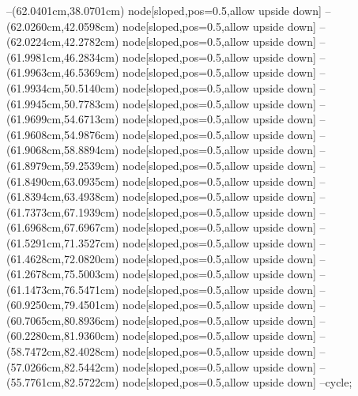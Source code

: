 --(62.0401cm,38.0701cm) node[sloped,pos=0.5,allow upside down]{\arrowIn}
--(62.0260cm,42.0598cm) node[sloped,pos=0.5,allow upside down]{\ArrowIn}
--(62.0224cm,42.2782cm) node[sloped,pos=0.5,allow upside down]{\arrowIn}
--(61.9981cm,46.2834cm) node[sloped,pos=0.5,allow upside down]{\ArrowIn}
--(61.9963cm,46.5369cm) node[sloped,pos=0.5,allow upside down]{\arrowIn}
--(61.9934cm,50.5140cm) node[sloped,pos=0.5,allow upside down]{\ArrowIn}
--(61.9945cm,50.7783cm) node[sloped,pos=0.5,allow upside down]{\arrowIn}
--(61.9699cm,54.6713cm) node[sloped,pos=0.5,allow upside down]{\ArrowIn}
--(61.9608cm,54.9876cm) node[sloped,pos=0.5,allow upside down]{\arrowIn}
--(61.9068cm,58.8894cm) node[sloped,pos=0.5,allow upside down]{\ArrowIn}
--(61.8979cm,59.2539cm) node[sloped,pos=0.5,allow upside down]{\arrowIn}
--(61.8490cm,63.0935cm) node[sloped,pos=0.5,allow upside down]{\ArrowIn}
--(61.8394cm,63.4938cm) node[sloped,pos=0.5,allow upside down]{\arrowIn}
--(61.7373cm,67.1939cm) node[sloped,pos=0.5,allow upside down]{\ArrowIn}
--(61.6968cm,67.6967cm) node[sloped,pos=0.5,allow upside down]{\arrowIn}
--(61.5291cm,71.3527cm) node[sloped,pos=0.5,allow upside down]{\ArrowIn}
--(61.4628cm,72.0820cm) node[sloped,pos=0.5,allow upside down]{\arrowIn}
--(61.2678cm,75.5003cm) node[sloped,pos=0.5,allow upside down]{\ArrowIn}
--(61.1473cm,76.5471cm) node[sloped,pos=0.5,allow upside down]{\ArrowIn}
--(60.9250cm,79.4501cm) node[sloped,pos=0.5,allow upside down]{\ArrowIn}
--(60.7065cm,80.8936cm) node[sloped,pos=0.5,allow upside down]{\ArrowIn}
--(60.2280cm,81.9360cm) node[sloped,pos=0.5,allow upside down]{\ArrowIn}
--(58.7472cm,82.4028cm) node[sloped,pos=0.5,allow upside down]{\ArrowIn}
--(57.0266cm,82.5442cm) node[sloped,pos=0.5,allow upside down]{\ArrowIn}
--(55.7761cm,82.5722cm) node[sloped,pos=0.5,allow upside down]{\ArrowIn}
--cycle;
